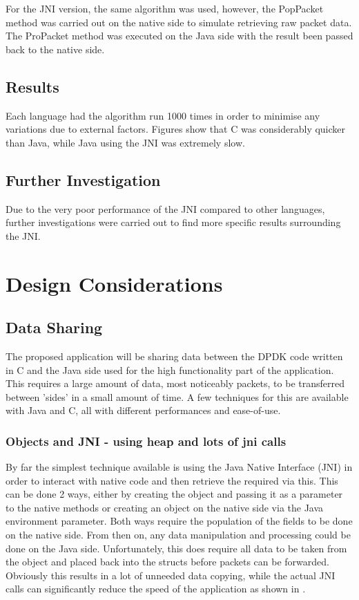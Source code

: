 \documentclass[final_report.tex]{subfiles}
\begin{document}
For the JNI version, the same algorithm was used, however, the PopPacket method was carried out on the native side to simulate retrieving raw packet data. The ProPacket method was executed on the Java side with the result been passed back to the native side.

\subsection{Results}
Each language had the algorithm run 1000 times in order to minimise any variations due to external factors. Figures  show that C was considerably quicker than Java, while Java using the JNI was extremely slow. 

\subsection{Further Investigation}
Due to the very poor performance of the JNI compared to other languages, further investigations were carried out to find more specific results surrounding the JNI.

\section{Design Considerations}
\subsection{Data Sharing}
The proposed application will be sharing data between the DPDK code written in C and the Java side used for the high functionality part of the application. This requires a large amount of data, most noticeably packets, to be transferred between 'sides' in a small amount of time.
A few techniques for this are available with Java and C, all with different performances and ease-of-use.

\subsubsection{Objects and JNI - using heap and lots of jni calls}
By far the simplest technique available is using the Java Native Interface (JNI) in order to interact with native code and then retrieve the required via this. This can be done 2 ways, either by creating the object and passing it as a parameter to the native methods or creating an object on the native side via the Java environment parameter. Both ways require the population of the fields to be done on the native side. From then on, any data manipulation and processing could be done on the Java side. Unfortunately, this does require all data to be taken from the object and placed back into the structs before packets can be forwarded. Obviously this results in a lot of unneeded data copying, while the actual JNI calls can significantly reduce the speed of the application as shown in .
\end{document}
